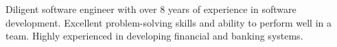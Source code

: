 

\begin{cvparagraph}

    Diligent software engineer with over 8 years of experience in software development.
    Excellent problem-solving skills and ability to perform well in a team.
    Highly experienced in developing financial and banking systems.
\end{cvparagraph}
